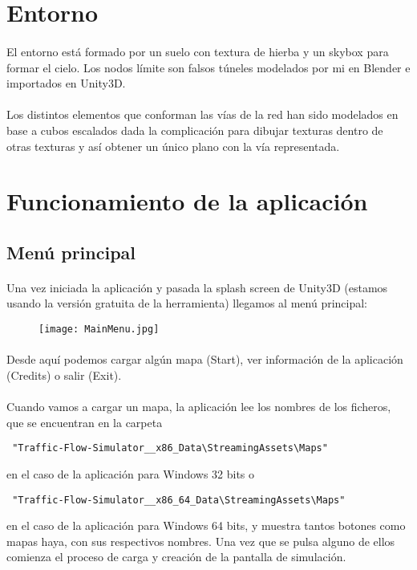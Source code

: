 \section{Entorno}

	\paragraph{}
	El entorno está formado por un suelo con textura de hierba y un skybox para formar el cielo. Los nodos límite son falsos túneles modelados por mi en Blender \cite{Blender_web} e importados en Unity3D.
	\paragraph{}
	Los distintos elementos que conforman las vías de la red han sido modelados en base a cubos escalados dada la complicación para dibujar texturas dentro de otras texturas y así obtener un único plano con la vía representada.
	
\section{Funcionamiento de la aplicación}
	
	\subsection{Menú principal}
	\paragraph{}
	Una vez iniciada la aplicación y pasada la splash screen de Unity3D (estamos usando la versión gratuita de la herramienta) llegamos al menú principal:
	
	\begin{figure}[H]
		\centering
			\texttt{[image: MainMenu.jpg]}
	\end{figure}
	
	\paragraph{}
	Desde aquí podemos cargar algún mapa (Start), ver información de la aplicación (Credits) o salir (Exit).

	\paragraph{}	
	Cuando vamos a cargar un mapa, la aplicación lee los nombres de los ficheros, que se encuentran en la carpeta
	\begin{verbatim} "Traffic-Flow-Simulator__x86_Data\StreamingAssets\Maps" \end{verbatim} en el caso de la aplicación para Windows 32 bits o 				\begin{verbatim} "Traffic-Flow-Simulator__x86_64_Data\StreamingAssets\Maps" \end{verbatim} en el caso de la aplicación para Windows 64 bits, y muestra tantos botones como mapas haya, con sus respectivos nombres. Una vez que se pulsa alguno de ellos comienza el proceso de carga y creación de la pantalla de simulación.
	
